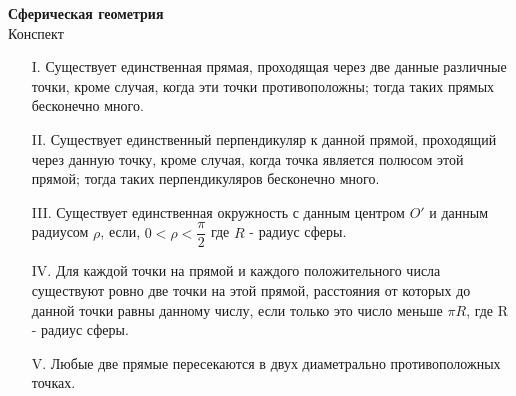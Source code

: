 


    \begin{center}
        \textbf{Сферическая геометрия}\\
        Конспект
    \end{center}

    \begin{enumerate}
        \item[I.] Существует единственная прямая, проходящая через две данные различные точки,
        кроме случая, когда эти точки противоположны; тогда таких прямых бесконечно много.
        \item[II.] Существует единственный перпендикуляр к данной прямой, проходящий через данную точку,
        кроме случая, когда точка является полюсом этой прямой;
        тогда таких перпендикуляров бесконечно много.
        \item[III.] Существует единственная окружность с данным центром $O'$ и данным радиусом $\rho$,
        если, $0 < \rho < \dfrac{\pi}{2}$ где $R$ - радиус сферы.
        \item[IV.] Для каждой точки на прямой и каждого положительного числа существуют ровно две точки на этой прямой,
        расстояния от которых до данной точки равны данному числу,
        если только это число меньше $\pi R$, где R - радиус сферы.
        \item[V.] Любые две прямые пересекаются в двух диаметрально противоположных точках.
    \end{enumerate}

